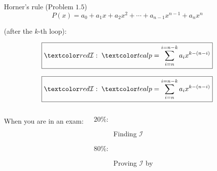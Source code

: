 
\begin{frame}{}
  \centerline{\Large {}}

\end{frame}

\begin{frame}{}
  \begin{exampleblock}{Horner's rule (Problem $1.5$)}
    \[
      P(x) = a_0 + a_1 x + a_2 x^2 + \cdots + a_{n-1} x^{n-1} + a_n x^n
    \]

    
  \end{exampleblock}

  \pause
  \vspace{0.50cm}
  \centerline{ (after the $k$-th loop):}
  \pause
  \[
    \boxed{\red{\mathcal{I}:}\;\; \teal{p = \sum_{i = n}^{i = n-k} a_i x^{k-(n-i)}}}
  \]
\end{frame}

\begin{frame}{}
  \[
    \boxed{\red{\mathcal{I}:}\;\; \teal{p = \sum_{i = n}^{i = n-k} a_i x^{k-(n-i)}}}
  \]

  \vspace{0.50cm}
  \begin{columns}
      \pause
      \qquad When you are in an exam:\\[5pt]
      \begin{description}
	\item[$20\%:$] Finding $\mathcal{I}$
	\item[$80\%:$] Proving $\mathcal{I}$ by 
      \end{description}
  \end{columns}
\end{frame}

